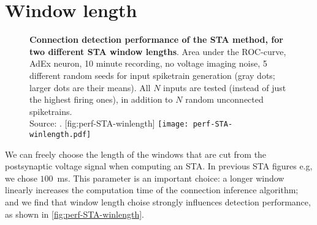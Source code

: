 \FloatBarrier
\vspace*{4em}
\section{Window length}

%

\begin{figure}
    \begin{sidecaption}
        {
            \textbf{Connection detection performance of the STA method, for two different STA window lengths}.
            Area under the ROC-curve, AdEx neuron, 10 minute recording, no voltage imaging noise, 5 different random seeds for input spiketrain generation (gray dots; larger dots are their means). All $N$ inputs are tested (instead of just the highest firing ones), in addition to $N$ random unconnected spiketrains.\\
            Source: .
        }
        [fig:perf-STA-winlength]
        \texttt{[image: perf-STA-winlength.pdf]}
    \end{sidecaption}
\end{figure}

We can freely choose the length of the windows that are cut from the postsynaptic voltage signal when computing an STA. In previous STA figures e.g, we chose $100$~ms. This parameter is an important choice: a longer window linearly increases the computation time of the connection inference algorithm; and we find that window length choise strongly influences detection performance, as shown in \cref{fig:perf-STA-winlength}.

